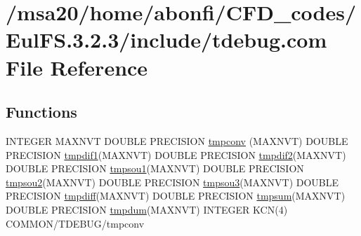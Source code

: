 \hypertarget{msa20_2home_2abonfi_2_c_f_d__codes_2_eul_f_s_83_82_83_2include_2tdebug_8com}{\section{/msa20/home/abonfi/\-C\-F\-D\-\_\-codes/\-Eul\-F\-S.3.2.3/include/tdebug.com File Reference}
\label{msa20_2home_2abonfi_2_c_f_d__codes_2_eul_f_s_83_82_83_2include_2tdebug_8com}
}
\subsection*{Functions}
\begin{DoxyCompactItemize}
\item 
I\-N\-T\-E\-G\-E\-R M\-A\-X\-N\-V\-T D\-O\-U\-B\-L\-E P\-R\-E\-C\-I\-S\-I\-O\-N \hyperlink{msa20_2home_2abonfi_2_c_f_d__codes_2_eul_f_s_83_82_83_2include_2tdebug_8com_afd5e6e7ac20f6e7f0166c993ec74b22e}{tmpconv} (M\-A\-X\-N\-V\-T) D\-O\-U\-B\-L\-E P\-R\-E\-C\-I\-S\-I\-O\-N \hyperlink{msa20_2home_2abonfi_2_c_f_d__codes_2_eul_f_s_83_82_83_2include_2tdebug_8com_a7d0989f9a38016617ca1bc61561d66ff}{tmpdif1}(M\-A\-X\-N\-V\-T) D\-O\-U\-B\-L\-E P\-R\-E\-C\-I\-S\-I\-O\-N \hyperlink{msa20_2home_2abonfi_2_c_f_d__codes_2_eul_f_s_83_82_83_2include_2tdebug_8com_ab964a6f708f4f29204794080b9468323}{tmpdif2}(M\-A\-X\-N\-V\-T) D\-O\-U\-B\-L\-E P\-R\-E\-C\-I\-S\-I\-O\-N \hyperlink{msa20_2home_2abonfi_2_c_f_d__codes_2_eul_f_s_83_82_83_2include_2tdebug_8com_a023b3a6f5da0440dce335a556cb89fe6}{tmpsou1}(M\-A\-X\-N\-V\-T) D\-O\-U\-B\-L\-E P\-R\-E\-C\-I\-S\-I\-O\-N \hyperlink{msa20_2home_2abonfi_2_c_f_d__codes_2_eul_f_s_83_82_83_2include_2tdebug_8com_a7e31143aa010697a65a7ffe87ef242e7}{tmpsou2}(M\-A\-X\-N\-V\-T) D\-O\-U\-B\-L\-E P\-R\-E\-C\-I\-S\-I\-O\-N \hyperlink{msa20_2home_2abonfi_2_c_f_d__codes_2_eul_f_s_83_82_83_2include_2tdebug_8com_aa8356e45fafae8344ea4ae9ccfe00326}{tmpsou3}(M\-A\-X\-N\-V\-T) D\-O\-U\-B\-L\-E P\-R\-E\-C\-I\-S\-I\-O\-N \hyperlink{msa20_2home_2abonfi_2_c_f_d__codes_2_eul_f_s_83_82_83_2include_2tdebug_8com_a5fcc422c86549ee48051b12b4b0b9003}{tmpdiff}(M\-A\-X\-N\-V\-T) D\-O\-U\-B\-L\-E P\-R\-E\-C\-I\-S\-I\-O\-N \hyperlink{msa20_2home_2abonfi_2_c_f_d__codes_2_eul_f_s_83_82_83_2include_2tdebug_8com_af2cc9aa6a0cb8a889362cdb7fc0977ea}{tmpsum}(M\-A\-X\-N\-V\-T) D\-O\-U\-B\-L\-E P\-R\-E\-C\-I\-S\-I\-O\-N \hyperlink{msa20_2home_2abonfi_2_c_f_d__codes_2_eul_f_s_83_82_83_2include_2tdebug_8com_a85a53731c75ba4f8b2fb687cdcbe3f66}{tmpdum}(M\-A\-X\-N\-V\-T) I\-N\-T\-E\-G\-E\-R K\-C\-N(4) C\-O\-M\-M\-O\-N/T\-D\-E\-B\-U\-G/tmpconv
\end{DoxyCompactItemize}
